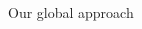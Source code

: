 \documentclass{beamer}
\begin{document}
\begin{frame}[t]
\begin{tcolorbox}[adjusted title={\centering\large Objectives}]
        \end{tcolorbox}
        \vfill
        \begin{tcolorbox}[adjusted title={\centering\large Approach}]
            \begin{columns}[T]
                \begin{column}{.35\textwidth}
                    \begin{figure}[htb]
                        \resizebox{\columnwidth}{!}{
                            
                        }
                        \vspace{-1.5cm}
                        \caption{Our global approach}
                    \end{figure}
                \end{column}
                \begin{column}{.64\textwidth}
                \end{column}
            \end{columns}
        \end{tcolorbox}
        \vfill
    \end{frame}
\end{document}
